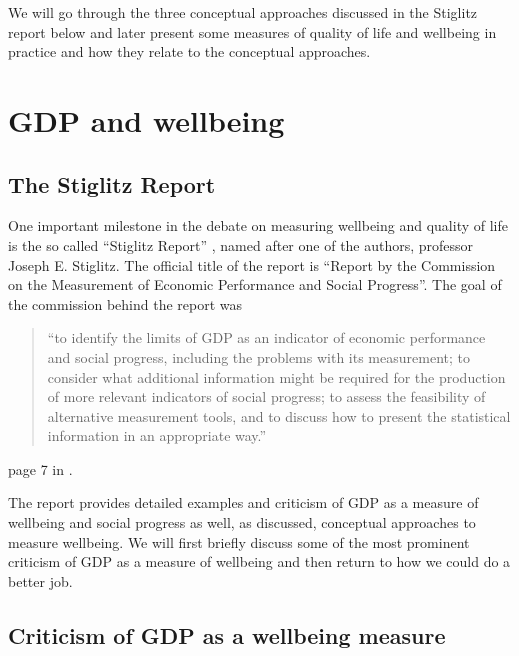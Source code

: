 \documentclass[
]{book}
\begin{document}
\citep[page 41 in][]{stiglitz2010report}

We will go through the three conceptual approaches discussed in the Stiglitz report below and later present some measures of quality of life and wellbeing in practice and how they relate to the conceptual approaches.

\hypertarget{gdp-and-wellbeing}{%
\section{GDP and wellbeing}\label{gdp-and-wellbeing}}

\hypertarget{the-stiglitz-report}{%
\subsection*{The Stiglitz Report}\label{the-stiglitz-report}}

One important milestone in the debate on measuring wellbeing and quality of life is the so called ``Stiglitz Report'' \citep{stiglitz2010report}, named after one of the authors, professor Joseph E. Stiglitz. The official title of the report is ``Report by the Commission on the Measurement of Economic Performance and Social Progress''. The goal of the commission behind the report was

\begin{quote}
``to identify the limits of GDP as an indicator of economic performance and social progress, including the problems with its measurement; to consider what additional information might be required for the production of more
relevant indicators of social progress; to assess the feasibility of alternative measurement
tools, and to discuss how to present the statistical information in an appropriate way.''
\end{quote}

page 7 in \citep{stiglitz2010report}.

The report provides detailed examples and criticism of GDP as a measure of wellbeing and social progress as well, as discussed, conceptual approaches to measure wellbeing. We will first briefly discuss some of the most prominent criticism of GDP as a measure of wellbeing and then return to how we could do a better job.

\hypertarget{criticism-of-gdp-as-a-wellbeing-measure}{%
\subsection*{Criticism of GDP as a wellbeing measure}\label{criticism-of-gdp-as-a-wellbeing-measure}}
\end{document}
